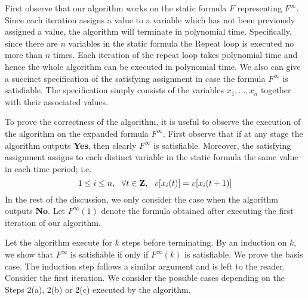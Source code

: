 First observe that our algorithm works on the static formula $F$ representing
$F^{\infty}$. Since each iteration assigns a value to a variable which has
not been previously assigned a value, the algorithm will terminate
in polynomial time. Specifically, since there are $n$ variables in the static
formula the Repeat loop is executed no more than $n$ times. Each iteration
of the repeat loop takes polynomial time and hence the whole algorithm 
can be executed in polynomial time. We also can give a succinct specification
of the satisfying assignment in case the formula $F^{\infty}$ is satisfiable.
The specification simply consists of the variables $x_1, \ldots, x_n$ together
with their associated values. 

To prove the correctness of the algorithm, it is useful to observe the
execution of the algorithm on the expanded formula $F^{\infty}$. 
First observe that if at any stage the algorithm  outputs {\bf Yes}, 
then clearly $F^{\infty}$ is satisfiable. Moreover, the satisfying assignment
assigns to each distinct variable in the static formula the same value in
each time period; i.e.  
\[ 1 \leq i \leq n, ~~ \forall t \in {\bf Z}, ~~ v[x_i(t)] = v[x_i(t+1)] \]
In the rest of the discussion, we only consider
the case when the algorithm outputs {\bf No}.  
Let $F^{\infty}(1)$ denote the formula obtained after executing the first
iteration of our algorithm.

Let the algorithm execute for $k$ steps before terminating.
By an induction  on $k$, we show that
$F^{\infty}$ is  satisfiable if only if
$F^{\infty}(k)$ is satisfiable. We prove the basis case. The induction step
follows a similar argument and is left to the reader.
Consider   the first iteration. 
We consider the possible cases depending on the Steps 
2(a), 2(b) or 2(c) executed by the algorithm.

